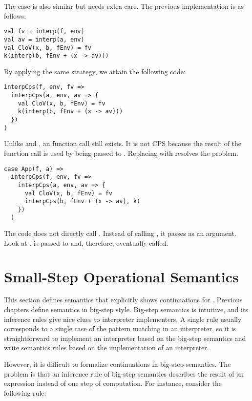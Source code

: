 The  case is also similar but needs extra care.
The previous implementation is as follows:

\begin{verbatim}
val fv = interp(f, env)
val av = interp(a, env)
val CloV(x, b, fEnv) = fv
k(interp(b, fEnv + (x -> av)))
\end{verbatim}

By applying the same strategy, we attain the following code:

\begin{verbatim}
interpCps(f, env, fv =>
  interpCps(a, env, av => {
    val CloV(x, b, fEnv) = fv
    k(interp(b, fEnv + (x -> av)))
  })
)
\end{verbatim}

Unlike  and , an  function call still exists.
It is not CPS because the result of the function call is used by being passed to
. Replacing  with  resolves the problem.

\begin{verbatim}
case App(f, a) =>
  interpCps(f, env, fv =>
    interpCps(a, env, av => {
      val CloV(x, b, fEnv) = fv
      interpCps(b, fEnv + (x -> av), k)
    })
  )
\end{verbatim}

The code does not directly call . Instead of calling , it passes
 as an argument. Look at .
 is passed to  and, therefore, eventually called.

\section{Small-Step Operational Semantics}

This section defines semantics that explicitly shows continuations for \lang.
Previous chapters define semantics in big-step style. Big-step semantics is
intuitive, and its inference rules give nice clues to interpreter implementers.
A single rule usually corresponds to a single case of the pattern matching in
an interpreter, so it is straightforward to implement an interpreter based on
the big-step semantics and write semantics rules based on the implementation of
an interpreter.

However, it is difficult to formalize continuations in big-step semantics.
The problem is that an inference rule of big-step semantics describes the result
of an expression instead of one step of computation.
For instance, consider the following rule:

